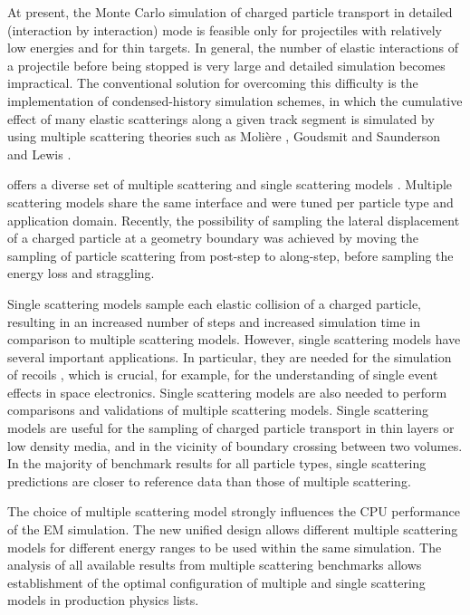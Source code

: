At present, the Monte Carlo simulation of charged particle transport in detailed
(interaction by interaction) mode is feasible only for projectiles with 
relatively low energies and for thin targets.  In general, the number of 
elastic interactions of a projectile before being stopped is very large and
detailed simulation becomes impractical.  The conventional solution for 
overcoming this difficulty is the implementation of condensed-history 
simulation schemes, in which the cumulative effect of many elastic scatterings
along a given track segment is simulated by using multiple scattering theories
such as Moli\`{e}re \cite{embib:msc2, embib:msc3}, Goudsmit and Saunderson
\cite{embib:msc4} and Lewis \cite{embib:msc6}.

\Gfour{} offers a diverse set of multiple scattering and single scattering
models \cite{embib:msc61,embib:msc1,embib:msc8,embib:msc9}.  Multiple scattering
models share the same  interface and were tuned per particle
type and application domain.  Recently, the possibility of sampling the lateral 
displacement of a charged particle at a geometry boundary was achieved by moving
the sampling of particle scattering from post-step to along-step, before 
sampling the energy loss and straggling.

Single scattering models sample each elastic collision of a charged particle, 
resulting in an increased number of steps and increased simulation time in 
comparison to multiple scattering models.  However, single scattering models 
have several important applications.  In particular, they are needed for the 
simulation of recoils \cite{embib:msc8,embib:msc9}, which is crucial, for 
example, for the understanding of single event effects in space electronics. 
Single scattering models are also needed to perform comparisons and validations
of multiple scattering models.  Single scattering models are useful for the 
sampling of charged particle transport in thin layers or low density media, and
in the vicinity of boundary crossing between two volumes.  In the majority of 
benchmark results for all particle types, single scattering predictions are 
closer to reference data than those of multiple scattering.

The choice of multiple scattering model strongly influences the CPU 
performance of the EM simulation.  The new unified design \cite{bib:uni} allows 
different multiple scattering models for different energy ranges to be used 
within the same simulation.  The analysis of all available results from multiple
scattering benchmarks \cite{embib:chep11,embib:msc1,embib:chep12} 
allows establishment of the optimal configuration of multiple and single 
scattering models in production physics lists.

